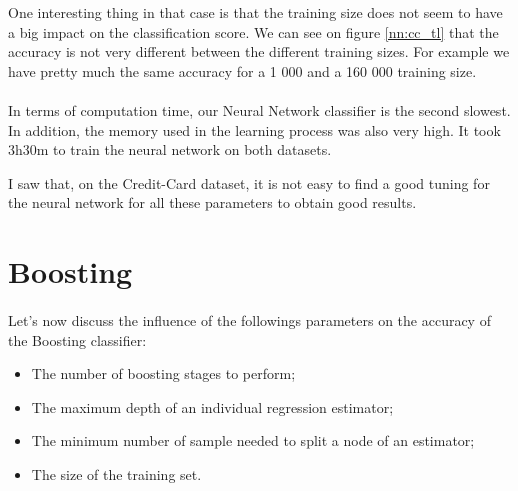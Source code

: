 \documentclass[10pt]{article}
\begin{document}
			One interesting thing in that case is that the training size does not seem to have a big impact on the classification score. We can see on figure \ref{nn:cc_tl} that the accuracy is not very different between the different training sizes. For example we have pretty much the same accuracy for a 1 000 and a 160 000 training size.
		\paragraph*{}
			In terms of computation time, our Neural Network classifier is the second slowest. In addition, the memory used in the learning process was also very high. It took 3h30m to train the neural network on both datasets.

			I saw that, on the Credit-Card dataset, it is not easy to find a good tuning for the neural network for all these parameters to obtain good results.
	\section{Boosting}
		\paragraph*{}
			Let's now discuss the influence of the followings parameters on the accuracy of the Boosting classifier:
			\begin{itemize}
				\item The number of boosting stages to perform;
				\item The maximum depth of an individual regression estimator;
				\item The minimum number of sample needed to split a node of an estimator;
				\item The size of the training set.
			\end{itemize}
\end{document}
